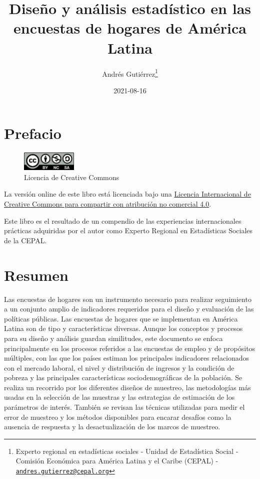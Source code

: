 \documentclass[
  10pt,
  spanish,
]{book}
\title{Diseño y análisis estadístico en las encuestas de hogares de América Latina}
\author{Andrés Gutiérrez\footnote{Experto regional en estadísticas sociales - Unidad de Estadística Social - Comisión Económica para América Latina y el Caribe (CEPAL) - \href{mailto:andres.gutierrez@cepal.org}{\nolinkurl{andres.gutierrez@cepal.org}}}}
\date{2021-08-16}
\begin{document}
\maketitle

{
\hypersetup{linkcolor=}
\setcounter{tocdepth}{1}
\tableofcontents
}
\listoftables
\listoffigures
\hypertarget{prefacio}{%
\chapter*{Prefacio}\label{prefacio}}

\begin{figure}
\includegraphics[width=100px]{Pics/CClicence} \caption{Licencia de Creative Commons}\label{fig:unnamed-chunk-1}
\end{figure}

La versión online de este libro está licenciada bajo una \href{http://creativecommons.org/licenses/by-nc-sa/4.0/}{Licencia Internacional de Creative Commons para compartir con atribución no comercial 4.0}.

Este libro es el resultado de un compendio de las experiencias internacionales prácticas adquiridas por el autor como Experto Regional en Estadísticas Sociales de la CEPAL.

\hypertarget{resumen}{%
\chapter*{Resumen}\label{resumen}}

Las encuestas de hogares son un instrumento necesario para realizar seguimiento a un conjunto amplio de indicadores requeridos para el diseño y evaluación de las políticas públicas. Las encuestas de hogares que se implementan en América Latina son de tipo y características diversas. Aunque los conceptos y procesos para su diseño y análisis guardan similitudes, este documento se enfoca principalmente en los procesos referidos a las encuestas de empleo y de propósitos múltiples, con las que los países estiman los principales indicadores relacionados con el mercado laboral, el nivel y distribución de ingresos y la condición de pobreza y las principales características sociodemográficas de la población. Se realiza un recorrido por los diferentes diseños de muestreo, las metodologías más usadas en la selección de las muestras y las estrategias de estimación de los parámetros de interés. También se revisan las técnicas utilizadas para medir el error de muestreo y los métodos disponibles para encarar desafíos como la ausencia de respuesta y la desactualización de los marcos de muestreo.
\end{document}
